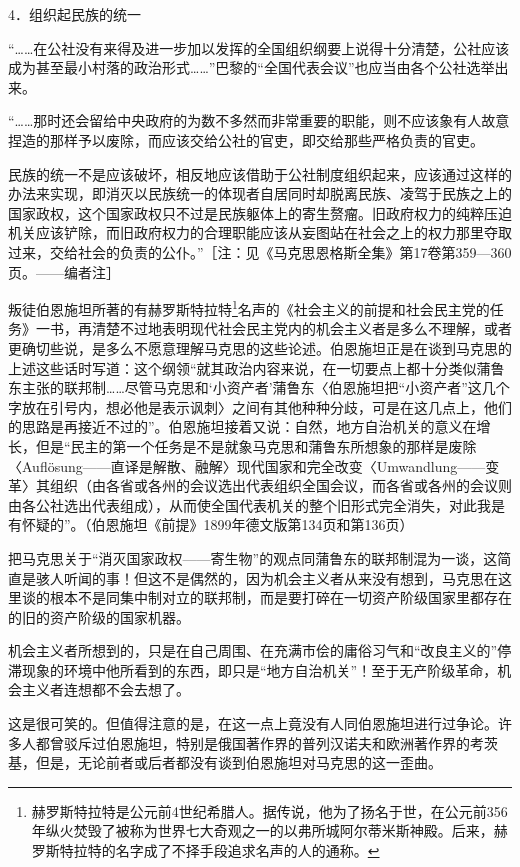 \documentclass[UTF8, 12pt, a4paper]{ctexrep}
\begin{document}
4．组织起民族的统一

“……在公社没有来得及进一步加以发挥的全国组织纲要上说得十分清楚，公社应该成为甚至最小村落的政治形式……”巴黎的“全国代表会议”也应当由各个公社选举出来。

“……那时还会留给中央政府的为数不多然而非常重要的职能，则不应该象有人故意捏造的那样予以废除，而应该交给公社的官吏，即交给那些严格负责的官吏。

民族的统一不是应该破坏，相反地应该借助于公社制度组织起来，应该通过这样的办法来实现，即消灭以民族统一的体现者自居同时却脱离民族、凌驾于民族之上的国家政权，这个国家政权只不过是民族躯体上的寄生赘瘤。旧政府权力的纯粹压迫机关应该铲除，而旧政府权力的合理职能应该从妄图站在社会之上的权力那里夺取过来，交给社会的负责的公仆。”［注：见《马克思恩格斯全集》第17卷第359—360页。——编者注］

叛徒伯恩施坦所著的有赫罗斯特拉特\footnote{赫罗斯特拉特是公元前4世纪希腊人。据传说，他为了扬名于世，在公元前356年纵火焚毁了被称为世界七大奇观之一的以弗所城阿尔蒂米斯神殿。后来，赫罗斯特拉特的名字成了不择手段追求名声的人的通称。}名声的《社会主义的前提和社会民主党的任务》一书，再清楚不过地表明现代社会民主党内的机会主义者是多么不理解，或者更确切些说，是多么不愿意理解马克思的这些论述。伯恩施坦正是在谈到马克思的上述这些话时写道：这个纲领“就其政治内容来说，在一切要点上都十分类似蒲鲁东主张的联邦制……尽管马克思和‘小资产者’蒲鲁东〈伯恩施坦把“小资产者”这几个字放在引号内，想必他是表示讽刺〉之间有其他种种分歧，可是在这几点上，他们的思路是再接近不过的”。伯恩施坦接着又说：自然，地方自治机关的意义在增长，但是“民主的第一个任务是不是就象马克思和蒲鲁东所想象的那样是废除〈Auflösung——直译是解散、融解〉现代国家和完全改变〈Umwandlung——变革〉其组织（由各省或各州的会议选出代表组织全国会议，而各省或各州的会议则由各公社选出代表组成），从而使全国代表机关的整个旧形式完全消失，对此我是有怀疑的”。（伯恩施坦《前提》1899年德文版第134页和第136页）

把马克思关于“消灭国家政权——寄生物”的观点同蒲鲁东的联邦制混为一谈，这简直是骇人听闻的事！但这不是偶然的，因为机会主义者从来没有想到，马克思在这里谈的根本不是同集中制对立的联邦制，而是要打碎在一切资产阶级国家里都存在的旧的资产阶级的国家机器。

机会主义者所想到的，只是在自己周围、在充满市侩的庸俗习气和“改良主义的”停滞现象的环境中他所看到的东西，即只是“地方自治机关”！至于无产阶级革命，机会主义者连想都不会去想了。

这是很可笑的。但值得注意的是，在这一点上竟没有人同伯恩施坦进行过争论。许多人都曾驳斥过伯恩施坦，特别是俄国著作界的普列汉诺夫和欧洲著作界的考茨基，但是，无论前者或后者都没有谈到伯恩施坦对马克思的这一歪曲。
\end{document}

